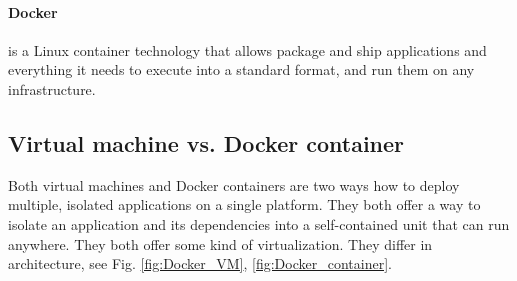 \documentclass[12pt,a4paper]{article}
\begin{document}
\paragraph{Docker} is a Linux container technology that allows package and ship applications and everything it needs to execute into a standard
format, and run them on any infrastructure.

\subsection{Virtual machine vs. Docker container}
Both virtual machines and Docker containers are two ways how to deploy multiple, isolated applications on a single platform. They
both offer a way to isolate an application and its dependencies into a self-contained unit that can run anywhere. They both offer
some kind of virtualization. They differ in architecture, see Fig. \ref{fig:Docker_VM}, \ref{fig:Docker_container}.

\begin{figure}[h!]
\centering
\begin{floatrow}
\end{floatrow}
\end{figure}
\end{document}
